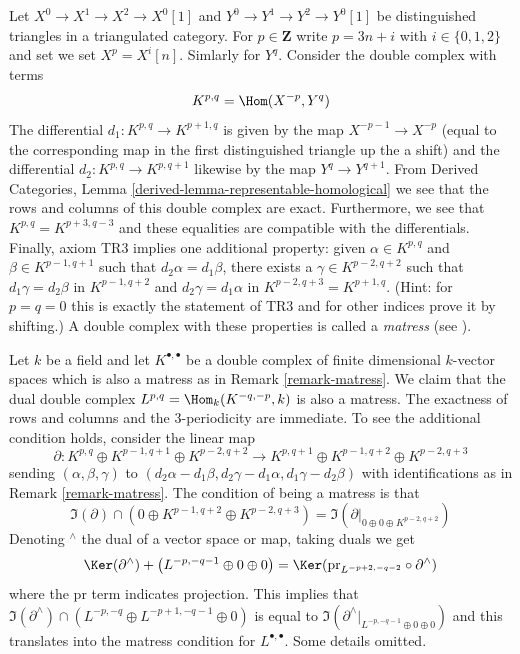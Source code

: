 \begin{remark}
\label{remark-matress}
Let $X^0 \to X^1 \to X^2 \to X^0[1]$ and $Y^0 \to Y^1 \to Y^2 \to Y^0[1]$
be distinguished triangles in a triangulated category. For
$p \in \mathbf{Z}$ write $p = 3n + i$ with $i \in \{0, 1, 2\}$ and set
we set $X^p = X^i[n]$. Simlarly for $Y^q$. Consider the double complex
with terms
$$
K^{p, q} = \Hom(X^{-p}, Y^q)
$$
The differential $d_1 : K^{p, q} \to K^{p + 1, q}$ is given by the map
$X^{-p - 1} \to X^{-p}$ (equal to the corresponding map
in the first distinguished triangle up the a shift)
and the differential $d_2 : K^{p, q} \to K^{p, q + 1}$ likewise
by the map $Y^q \to Y^{q + 1}$. From
Derived Categories, Lemma \ref{derived-lemma-representable-homological}
we see that the rows and columns of this double complex are exact.
Furthermore, we see that $K^{p, q} = K^{p + 3, q - 3}$ and these
equalities are compatible with the differentials. Finally, axiom TR3
implies one additional property: given
$\alpha \in K^{p, q}$ and $\beta \in K^{p - 1, q + 1}$ such
that $d_2 \alpha = d_1 \beta$, there exists a $\gamma \in K^{p - 2, q + 2}$
such that
$d_1 \gamma = d_2 \beta $ in $K^{p - 1, q + 2}$ and 
$d_2 \gamma = d_1 \alpha $ in $K^{p - 2, q + 3} = K^{p + 1, q}$.
(Hint: for $p = q = 0$ this is exactly the statement of TR3
and for other indices prove it by shifting.)
A double complex with these properties is called a {\it matress}
(see \cite{Bondal-Kapranov}).
\end{remark}

\begin{remark}
\label{remark-dual-matress}
Let $k$ be a field and let $K^{\bullet, \bullet}$ be a double complex
of finite dimensional $k$-vector spaces which is also a matress as in
Remark \ref{remark-matress}. We claim that the dual double complex
$L^{p, q} = \Hom_k(K^{-q, -p}, k)$ is also a matress. The exactness of
rows and columns and the 3-periodicity are immediate. To see the
additional condition holds, consider the linear map
$$
\partial :
K^{p, q} \oplus K^{p - 1, q + 1} \oplus K^{p - 2, q + 2}
\longrightarrow
K^{p, q + 1} \oplus K^{p - 1, q + 2} \oplus K^{p - 2, q + 3}
$$
sending $(\alpha, \beta, \gamma)$ to
$(d_2 \alpha - d_1 \beta, d_2 \gamma - d_1 \alpha, d_1 \gamma - d_2 \beta)$
with identifications as in Remark \ref{remark-matress}.
The condition of being a matress is that
$$
\Im(\partial) \cap
\left( 0 \oplus K^{p - 1, q + 2} \oplus K^{p - 2, q + 3} \right)
=
\Im(\partial|_{0 \oplus 0 \oplus K^{p - 2, q + 2}})
$$
Denoting ${}^\wedge$ the dual of a vector space or map, taking duals
we get
$$
\Ker(\partial^\wedge) +
\left(L^{-p, -q - 1} \oplus 0 \oplus 0 \right)
=
\Ker(\text{pr}_{L^{-p + 2, -q - 2}} \circ \partial^\wedge)
$$
where the $\text{pr}$ term indicates projection. This implies
that
$\Im(\partial^\wedge) \cap (L^{-p, -q} \oplus L^{-p + 1, -q - 1} \oplus 0)$
is equal to
$\Im(\partial^\wedge|_{L^{-p, -q - 1} \oplus 0 \oplus 0})$ and this
translates into the matress condition for $L^{\bullet, \bullet}$.
Some details omitted.
\end{remark}

